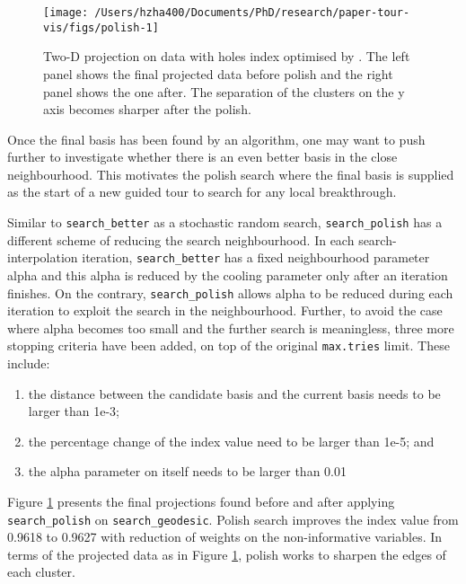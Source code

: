 \begin{Schunk}
\begin{figure}

{\centering \texttt{[image: /Users/hzha400/Documents/PhD/research/paper-tour-vis/figs/polish-1]} 

}

\caption[Two-D projection on  data with holes index optimised by ]{Two-D projection on  data with holes index optimised by . The left panel shows the final projected data before polish and the right panel shows the one after. The separation of the clusters on the y axis becomes sharper after the polish. }\label{fig:polish}
\end{figure}
\end{Schunk}

Once the final basis has been found by an algorithm, one may want to
push further to investigate whether there is an even better basis in the
close neighbourhood. This motivates the polish search where the final
basis is supplied as the start of a new guided tour to search for any
local breakthrough.

Similar to \texttt{search\_better} as a stochastic random search,
\texttt{search\_polish} has a different scheme of reducing the search
neighbourhood. In each search-interpolation iteration,
\texttt{search\_better} has a fixed neighbourhood parameter alpha and
this alpha is reduced by the cooling parameter only after an iteration
finishes. On the contrary, \texttt{search\_polish} allows alpha to be
reduced during each iteration to exploit the search in the
neighbourhood. Further, to avoid the case where alpha becomes too small
and the further search is meaningless, three more stopping criteria have
been added, on top of the original \texttt{max.tries} limit. These
include:

\begin{enumerate}
\def\labelenumi{\arabic{enumi})}
\tightlist
\item
  the distance between the candidate basis and the current basis needs
  to be larger than 1e-3;
\item
  the percentage change of the index value need to be larger than 1e-5;
  and
\item
  the alpha parameter on itself needs to be larger than 0.01
\end{enumerate}

Figure \ref{fig:polish} presents the final projections found before and
after applying \texttt{search\_polish} on \texttt{search\_geodesic}.
Polish search improves the index value from 0.9618 to 0.9627 with
reduction of weights on the non-informative variables. In terms of the
projected data as in Figure \ref{fig:polish}, polish works to sharpen
the edges of each cluster.

